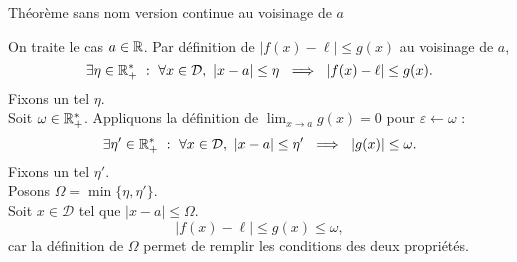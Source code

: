 \documentclass{article}
\begin{document}
\begin{question_kholle}
	{Théorème sans nom version continue au voisinage de $a$}

	On traite le cas $a\in \mathbb R$. Par définition de $|f(x) - \ell| \leq g(x)$ au voisinage de $a$,
	\[
		\exists \eta \in \mathbb R _+ ^* \ : \ \forall x \in \mathcal{D}, \ |x-a| \leq \eta \ \implies \ |f(x) - \ell| \leq g(x).
	\]
	Fixons un tel $\eta$. \\
	Soit $\omega \in \mathbb R_+ ^*$. Appliquons la définition de $\lim_{x \to a} g(x) = 0$ pour $\varepsilon \gets \omega$ :
	\[
		\exists \eta' \in \mathbb R_+ ^* \ : \ \forall x \in \mathcal{D}, \ |x-a| \leq \eta' \ \implies \ |g(x)| \leq \omega.
	\]
	Fixons un tel $\eta'$. \\
	Posons $\Omega = \min{ \{\eta,  \eta' \} }$. \\
	Soit $x\in \mathcal{D}$ tel que $|x-a| \leq \Omega$.
	\[
		|f(x) - \ell | \leq g(x) \leq \omega,
	\]
	car la définition de $\Omega$ permet de remplir les conditions des deux propriétés.
\end{question_kholle}
\end{document}

